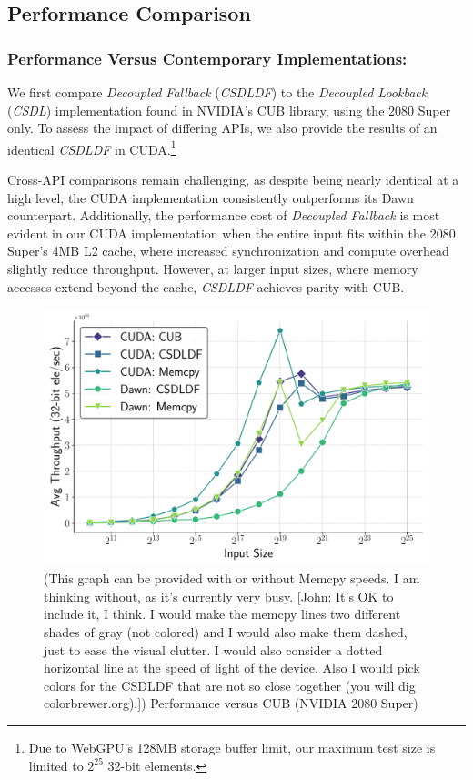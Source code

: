 \documentclass[sigconf]{acmart}
\newcommand{\john}[1]{{\footnotesize\color{cyan}[John: #1]}}
\begin{document}
\subsection{Performance Comparison}
\subsubsection{Performance Versus Contemporary Implementations:}
We first compare \emph{Decoupled Fallback} (\emph{CSDLDF}) to the \emph{Decoupled Lookback} (\emph{CSDL}) implementation found in NVIDIA’s CUB library, using the 2080 Super only. To assess the impact of differing APIs, we also provide the results of an identical \emph{CSDLDF} in CUDA.\footnote{Due to WebGPU’s 128MB storage buffer limit, our maximum test size is limited to $2^{25}$ 32-bit elements.}

Cross-API comparisons remain challenging, as despite being nearly identical at a high level, the CUDA implementation consistently outperforms its Dawn counterpart. Additionally, the performance cost of \emph{Decoupled Fallback} is most evident in our CUDA implementation when the entire input fits within the 2080 Super’s 4MB L2 cache, where increased synchronization and compute overhead slightly reduce throughput. However, at larger input sizes, where memory accesses extend beyond the cache, \emph{CSDLDF} achieves parity with CUB.

\begin{figure}
  \centering
  \includegraphics[width=\linewidth]{graphics/cuda_plot.pdf}
  \caption{(This graph can be provided with or without Memcpy speeds. I am thinking without, as it's currently very busy. \john{It's OK to include it, I think. I would make the memcpy lines two different shades of gray (not colored) and I would also make them dashed, just to ease the visual clutter. I would also consider a dotted horizontal line at the speed of light of the device. Also I would pick colors for the CSDLDF that are not so close together (you will dig colorbrewer.org).}) Performance versus CUB (NVIDIA 2080 Super)}
\end{figure}
\end{document}
